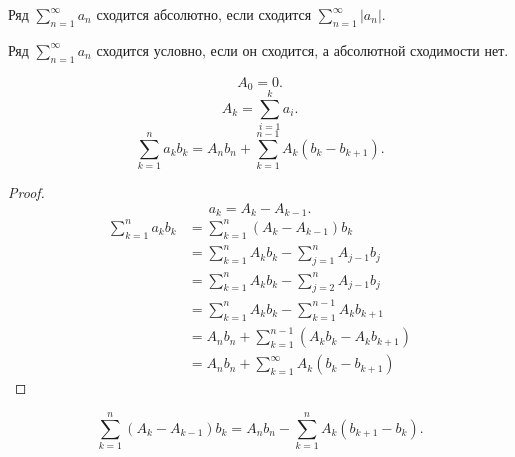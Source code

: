 \begin{definition} \thmslashn 

    Ряд $\sum\limits_{n=1}^{\infty} a_{n}$ сходится абсолютно, если сходится $\sum\limits_{n=1}^{\infty} |a_{n}|$.
\end{definition}
\begin{definition} \thmslashn 

    Ряд $\sum\limits_{n=1}^{\infty} a_{n}$ сходится условно, если он сходится, а абсолютной сходимости нет.
\end{definition}
\begin{theorem} \thmslashn

    \[ A_0 = 0 .\]
    \[ A_{k} = \sum\limits_{i=1}^{k} a_{i} .\] 
    \[ \sum\limits_{k=1}^{n} a_{k}b_{k} = A_{n}b_{n} + \sum\limits_{k=1}^{n-1} A_{k}(b_{k}-b_{k+1}) .\] 
    \begin{proof} \thmslashn
    
        \[ a_{k} = A_{k} - A_{k-1} .\]
        \begin{equation*}
            \begin{split}
                \sum\limits_{k=1}^{n} a_{k}b_{k} 
                &= \sum\limits_{k=1}^{n} (A_{k} - A_{k-1})b_{k}\\
                &= \sum\limits_{k=1}^{n} A_{k}b_{k} - \sum\limits_{j=1}^{n} A_{j-1}b_{j}\\
                &= \sum\limits_{k=1}^{n} A_{k}b_{k} - \sum\limits_{j=2}^{n} A_{j-1}b_{j}\\
                &= \sum\limits_{k=1}^{n} A_{k}b_{k} - \sum\limits_{k=1}^{n-1} A_{k}b_{k+1}\\
                &= A_{n}b_{n} + \sum\limits_{k=1}^{n-1} (A_{k}b_{k} - A_{k}b_{k+1})\\
                &= A_{n}b_{n} + \sum\limits_{k=1}^{\infty} A_{k}(b_{k} - b_{k+1})
            \end{split}
        \end{equation*}
    \end{proof}
\end{theorem}
\begin{consequence} \thmslashn

    \[ \sum\limits_{k=1}^{n} (A_{k} - A_{k-1})b_{k} = A_{n}b_{n} - \sum\limits_{k=1}^{n} A_{k}(b_{k+1}-b_{k}) .\]   
\end{consequence}
